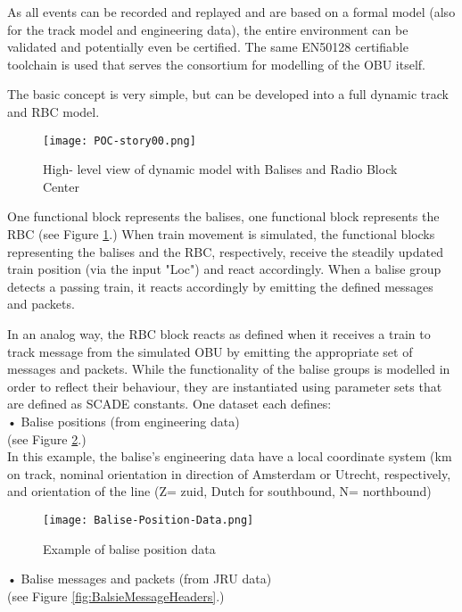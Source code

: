 As all events can be recorded and replayed and are based on a formal model (also for the track model and engineering data), the entire environment can be validated and potentially even be certified.
The same EN50128 certifiable toolchain is used that serves the consortium for modelling of the OBU itself.

The basic concept is very simple, but can be developed into a full dynamic track and RBC model.
\begin{figure}
  \centering
  \texttt{[image: POC-story00.png]}
  \caption{High- level view of dynamic model with Balises and Radio Block Center}
  \label{fig:track-story00}
 \end{figure}
One functional block represents the balises, one functional block represents the RBC (see Figure \ref{fig:track-story00}.) When train movement is simulated, the functional blocks representing the balises and the RBC, respectively, receive the steadily updated train position (via the input "Loc") and react accordingly.
When a balise group detects a passing train, it reacts accordingly by emitting the defined messages and packets.

In an analog way, the RBC block reacts as defined when it receives a train to track message from the simulated OBU by emitting the appropriate set of messages and packets.
While the functionality of the balise groups is modelled in order to reflect their behaviour, they are instantiated using parameter sets that are defined as SCADE constants.
One dataset each defines:\\

•  	Balise positions (from engineering data)\\
(see Figure \ref{fig:Balise-Position-Data}.)\\

In this example, the balise's engineering data have a local coordinate system (km on track, nominal orientation in direction of Amsterdam or Utrecht, respectively, and orientation of the line (Z= zuid, Dutch for southbound, N= northbound)

\begin{figure}
  \centering
  \texttt{[image: Balise-Position-Data.png]}
  \caption{Example of balise position data}
  \label{fig:Balise-Position-Data}
\end{figure}

•  	Balise messages and packets (from JRU data)\\
(see Figure \ref{fig:BalsieMessageHeaders}.)\\


